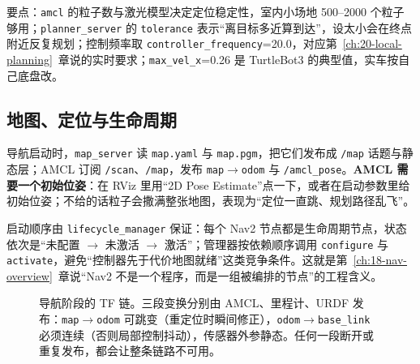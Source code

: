 要点：\texttt{amcl} 的粒子数与激光模型决定定位稳定性，室内小场地 500--2000 个粒子够用；\texttt{planner\_server} 的 \texttt{tolerance} 表示“离目标多近算到达”，设太小会在终点附近反复规划；控制频率取 \texttt{controller\_frequency}=20.0，对应第~\ref{ch:20-local-planning}~章说的实时要求；\texttt{max\_vel\_x}=0.26 是 TurtleBot3 的典型值，实车按自己底盘改。

\subsection{地图、定位与生命周期}

导航启动时，\texttt{map\_server} 读 \texttt{map.yaml} 与 \texttt{map.pgm}，把它们发布成 \texttt{/map} 话题与静态层；AMCL 订阅 \texttt{/scan}、\texttt{/map}，发布 \texttt{map}$\to$\texttt{odom} 与 \texttt{/amcl\_pose}。\textbf{AMCL 需要一个初始位姿}：在 RViz 里用“2D Pose Estimate”点一下，或者在启动参数里给初始位姿；不给的话粒子会撒满整张地图，表现为“定位一直跳、规划路径乱飞”。

启动顺序由 \texttt{lifecycle\_manager} 保证：每个 Nav2 节点都是生命周期节点，状态依次是“未配置 $\rightarrow$ 未激活 $\rightarrow$ 激活”；管理器按依赖顺序调用 \texttt{configure} 与 \texttt{activate}，避免“控制器先于代价地图就绪”这类竞争条件。这就是第~\ref{ch:18-nav-overview}~章说“Nav2 不是一个程序，而是一组被编排的节点”的工程含义。

\begin{figure}[htbp]
  \centering
  \caption{导航阶段的 TF 链。三段变换分别由 AMCL、里程计、URDF 发布：\texttt{map}$\to$\texttt{odom} 可跳变（重定位时瞬间修正），\texttt{odom}$\to$\texttt{base\_link} 必须连续（否则局部控制抖动），传感器外参静态。任何一段断开或重复发布，都会让整条链路不可用。}
  \label{fig:22-tf}
\end{figure}


